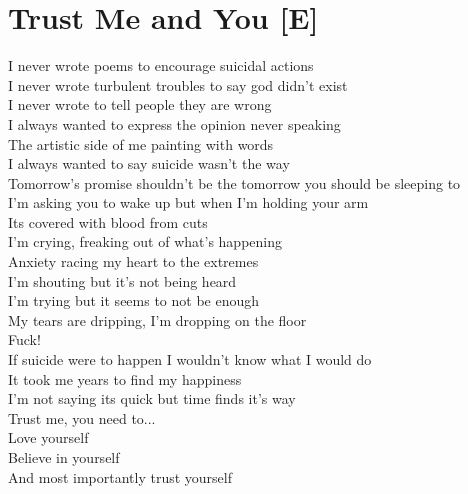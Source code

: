 \documentclass[12pt, b5paper, oneside]{book}
\begin{document}
\section{Trust Me and You [E]}
I never wrote poems to encourage suicidal actions
\\I never wrote turbulent troubles to say god didn't exist
\\I never wrote to tell people they are wrong
\\I always wanted to express the opinion never speaking
\\The artistic side of me painting with words
\\I always wanted to say suicide wasn't the way
\\Tomorrow's promise shouldn't be the tomorrow you should be sleeping to
\\I'm asking you to wake up but when I'm holding your arm
\\Its covered with blood from cuts
\\I'm crying, freaking out of what's happening
\\Anxiety racing my heart to the extremes
\\I'm shouting but it's not being heard
\\I'm trying but it seems to not be enough
\\My tears are dripping, I'm dropping on the floor
\\Fuck!
\\If suicide were to happen I wouldn't know what I would do
\\It took me years to find my happiness
\\I'm not saying its quick but time finds it's way
\\Trust me, you need to...
\\Love yourself
\\Believe in yourself
\\And most importantly trust yourself 
\newpage
\end{document}
